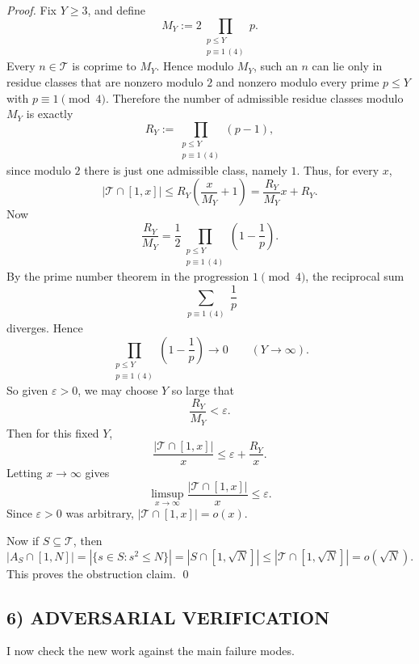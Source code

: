 \emph{Proof.}
Fix $Y\ge 3$, and define
\[
M_Y:=2\prod_{\substack{p\le Y\\ p\equiv 1\, (4)}}p.
\]
Every $n\in\mathcal T$ is coprime to $M_Y$.
Hence modulo $M_Y$, such an $n$ can lie only in residue classes that are nonzero modulo $2$ and nonzero modulo every prime $p\le Y$ with $p\equiv 1\pmod 4$.
Therefore the number of admissible residue classes modulo $M_Y$ is exactly
\[
R_Y:=\prod_{\substack{p\le Y\\ p\equiv 1\, (4)}}(p-1),
\]
since modulo $2$ there is just one admissible class, namely $1$.
Thus, for every $x$,
\[
|\mathcal T\cap[1,x]|
\le
R_Y\left(\frac{x}{M_Y}+1\right)
=
\frac{R_Y}{M_Y}x+R_Y.
\]
Now
\[
\frac{R_Y}{M_Y}
=
\frac12\prod_{\substack{p\le Y\\ p\equiv 1\, (4)}}\left(1-\frac1p\right).
\]
By the prime number theorem in the progression $1\pmod 4$, the reciprocal sum
\[
\sum_{\substack{p\equiv 1\, (4)}}\frac1p
\]
diverges. Hence
\[
\prod_{\substack{p\le Y\\ p\equiv 1\, (4)}}\left(1-\frac1p\right)\longrightarrow 0
\qquad (Y\to\infty).
\]
So given $\varepsilon>0$, we may choose $Y$ so large that
\[
\frac{R_Y}{M_Y}<\varepsilon.
\]
Then for this fixed $Y$,
\[
\frac{|\mathcal T\cap[1,x]|}{x}
\le
\varepsilon+\frac{R_Y}{x}.
\]
Letting $x\to\infty$ gives
\[
\limsup_{x\to\infty}\frac{|\mathcal T\cap[1,x]|}{x}\le \varepsilon.
\]
Since $\varepsilon>0$ was arbitrary, $|\mathcal T\cap[1,x]|=o(x)$.

Now if $S\subseteq\mathcal T$, then
\[
|A_S\cap[1,N]|=|\{s\in S:s^2\le N\}|=|S\cap[1,\sqrt N]|\le |\mathcal T\cap[1,\sqrt N]|=o(\sqrt N).
\]
This proves the obstruction claim.
\qed

\subsection*{6) ADVERSARIAL VERIFICATION}

I now check the new work against the main failure modes.

